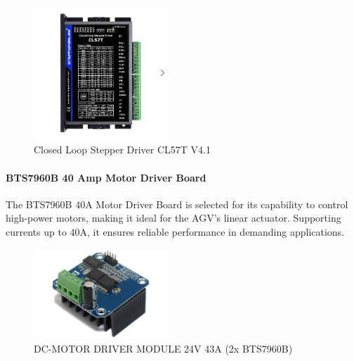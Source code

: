 \documentclass[../../main]{subfiles}
\begin{document}
\begin{figure}[H]
    \centering
    \includegraphics[width=0.45\textwidth]{fig/stepper_driver.png}
    \caption{ Closed Loop Stepper Driver CL57T V4.1 }
    \label{Stepper motor driver } %
\end{figure}

\paragraph{BTS7960B 40 Amp Motor Driver Board}

The BTS7960B 40A Motor Driver Board is selected for its capability to control 
high-power motors, making it ideal for the AGV’s linear actuator. 
Supporting currents up to 40A, it ensures reliable performance in demanding applications. 

\begin{figure}[H]
    \centering
    \includegraphics[width=0.45\textwidth]{fig/40_amp_driver.jpg}
    \caption{ DC-MOTOR DRIVER MODULE 24V 43A (2x BTS7960B) }
    \label{Linear actuator driver } %
\end{figure}
\end{document}
